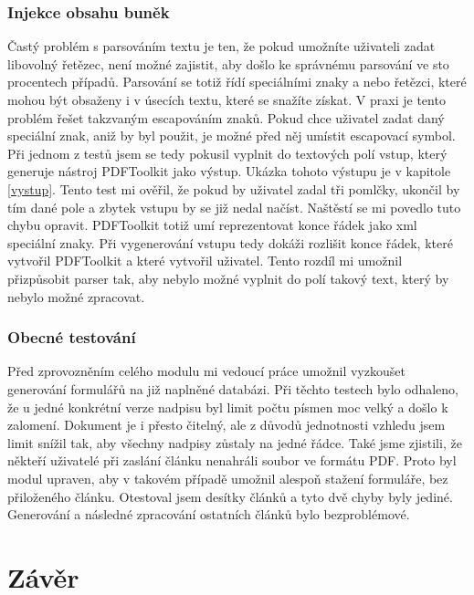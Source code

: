 \documentclass[czech,BP]{thesiskiv}
\begin{document}
\subsection{Injekce obsahu buněk}
Častý problém s parsováním textu je ten, že pokud umožníte uživateli zadat libovolný řetězec, není možné zajistit, aby došlo ke správnému parsování ve sto procentech případů. Parsování se totiž řídí speciálními znaky a nebo řetězci, které mohou být obsaženy i v úsecích textu, které se snažíte získat. V praxi je tento problém řešet takzvaným escapováním znaků. Pokud chce uživatel zadat daný speciální znak, aniž by byl použit, je možné před něj umístit escapovací symbol. Při jednom z testů jsem se tedy pokusil vyplnit do textových polí vstup, který generuje nástroj PDFToolkit jako výstup. Ukázka tohoto výstupu je v kapitole \ref{vystup}. Tento test mi ověřil, že pokud by uživatel zadal tři pomlčky, ukončil by tím dané pole a zbytek vstupu by se již nedal načíst. Naštěstí se mi povedlo tuto chybu opravit. PDFToolkit totiž umí reprezentovat konce řádek jako xml speciální znaky. Při vygenerování vstupu tedy dokáži rozlišit konce řádek, které vytvořil PDFToolkit a které vytvořil uživatel. Tento rozdíl mi umožnil přizpůsobit parser tak, aby nebylo možné vyplnit do polí takový text, který by nebylo možné zpracovat.
\subsection{Obecné testování}
Před zprovozněním celého modulu mi vedoucí práce umožnil vyzkoušet generování formulářů na již naplněné databázi. Při těchto testech bylo odhaleno, že u jedné konkrétní verze nadpisu byl limit počtu písmen moc velký a došlo k zalomení. Dokument je i přesto čitelný, ale z důvodů jednotnosti vzhledu jsem limit snížil tak, aby všechny nadpisy zůstaly na jedné řádce. Také jsme zjistili, že někteří uživatelé při zaslání článku nenahráli soubor ve formátu PDF. Proto byl modul upraven, aby v takovém případě umožnil alespoň stažení formuláře, bez přiloženého článku. Otestoval jsem desítky článků a tyto dvě chyby byly jediné. Generování a následné zpracování ostatních článků bylo bezproblémové.
\chapter{Závěr}

%

{\raggedright\small

}
\end{document}
